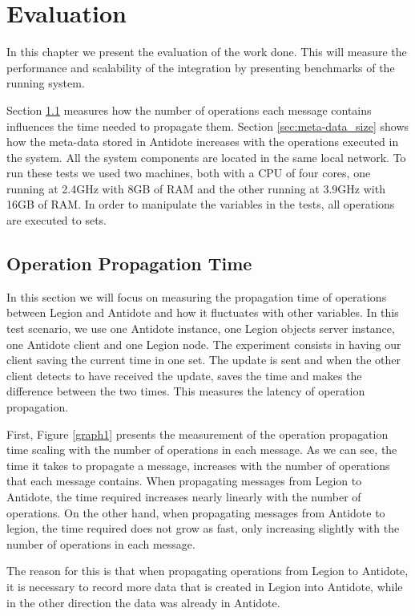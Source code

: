 \chapter{Evaluation}
\label{cha:evaluation}
In this chapter we present the evaluation of the work done. This will measure the performance and scalability of the integration by presenting benchmarks of the running system.\par
	Section \ref{sec:operation_propagation_time} measures how the number of operations each message contains influences the time needed to propagate them. Section \ref{sec:meta-data_size} shows how the meta-data stored in Antidote increases with the operations executed in the system. All the system components are located in the same local network. To run these tests we used two machines, both with a CPU of four cores, one running at 2.4GHz with 8GB of RAM and the other running at 3.9GHz with 16GB of RAM. In order to manipulate the variables in the tests, all operations are executed to sets.

\section{Operation Propagation Time}
\label{sec:operation_propagation_time}
In this section we will focus on measuring the propagation time of operations between Legion and Antidote and how it fluctuates with other variables. In this test scenario, we use one Antidote instance, one Legion objects server instance, one Antidote client and one Legion node. The experiment consists in having our client saving the current time in one set. The update is sent and when the other client detects to have received the update, saves the time and makes the difference between the two times. This measures the latency of operation propagation.\par
	First, Figure \ref{graph1} presents the measurement of the operation propagation time scaling with the number of operations in each message. As we can see, the time it takes to propagate a message, increases with the number of operations that each message contains. When propagating messages from Legion to Antidote, the time required increases nearly linearly with the number of operations. On the other hand, when propagating messages from Antidote to legion, the time required does not grow as fast, only increasing slightly with the number of operations in each message.\par
	The reason for this is that when propagating operations from Legion to Antidote, it is necessary to record more data that is created in Legion into Antidote, while in the other direction the data was already in Antidote.

